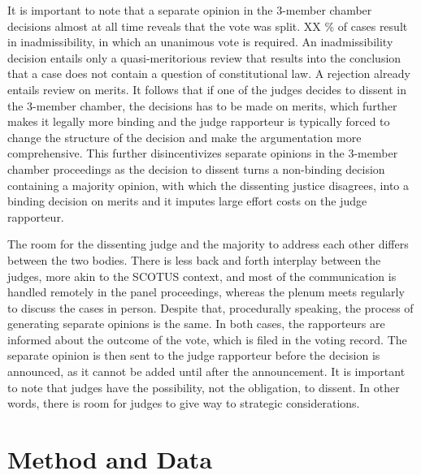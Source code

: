 \documentclass[
  11pt,
]{article}
\begin{document}
It is important to note that a separate opinion in the 3-member chamber decisions almost at all time reveals that the vote was split. XX \% of cases result in inadmissibility, in which an unanimous vote is required. An inadmissibility decision entails only a quasi-meritorious review that results into the conclusion that a case does not contain a question of constitutional law. A rejection already entails review on merits. It follows that if one of the judges decides to dissent in the 3-member chamber, the decisions has to be made on merits, which further makes it legally more binding and the judge rapporteur is typically forced to change the structure of the decision and make the argumentation more comprehensive. This further disincentivizes separate opinions in the 3-member chamber proceedings as the decision to dissent turns a non-binding decision containing a majority opinion, with which the dissenting justice disagrees, into a binding decision on merits and it imputes large effort costs on the judge rapporteur.

The room for the dissenting judge and the majority to address each other differs between the two bodies. There is less back and forth interplay between the judges, more akin to the SCOTUS context, and most of the communication is handled remotely in the panel proceedings, whereas the plenum meets regularly to discuss the cases in person. Despite that, procedurally speaking, the process of generating separate opinions is the same. In both cases, the rapporteurs are informed about the outcome of the vote, which is filed in the voting record. The separate opinion is then sent to the judge rapporteur before the decision is announced, as it cannot be added until after the announcement. It is important to note that judges have the possibility, not the obligation, to dissent. In other words, there is room for judges to give way to strategic considerations.

\section{Method and Data}\label{method-and-data}
\end{document}
